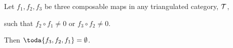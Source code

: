 \begin{proposition}
	Let \( f_1, f_2, f_3 \) be three composable maps in any triangulated category, \( {\mathcal{T}} \),
	\begin{center}
	\end{center}
	such that \( f_2 \circ f_1 \neq 0 \) or \( f_3 \circ f_2 \neq 0 \).

	Then \( \toda{f_3, f_2, f_1} = \emptyset \).
\end{proposition}
